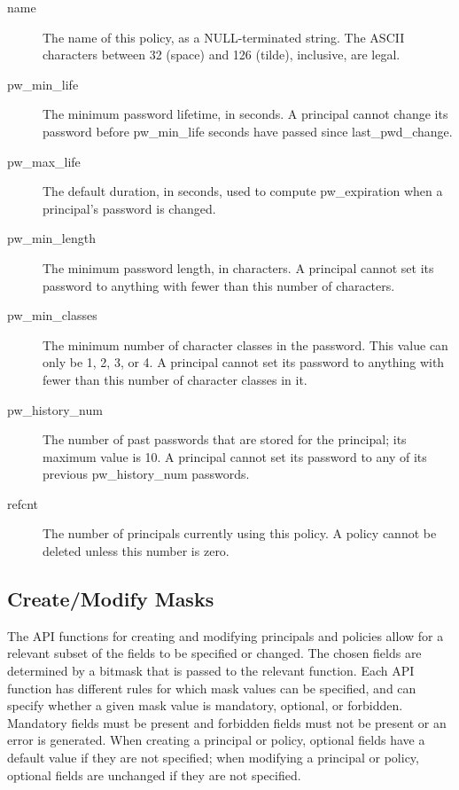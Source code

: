 \begin{description}
\item[name] The name of this policy, as a NULL-terminated string.
The ASCII characters between 32 (space) and 126 (tilde), inclusive,
are legal.

\item[pw_min_life] The minimum password lifetime, in seconds.
A principal cannot change its password before pw_min_life seconds have
passed since last_pwd_change.

\item[pw_max_life] The default duration, in seconds, used to compute
pw_expiration when a principal's password is changed.

\item[pw_min_length] The minimum password length, in characters.  A
principal cannot set its password to anything with fewer than this
number of characters.

\item[pw_min_classes] The minimum number of character classes in the
password.  This value can only be 1, 2, 3, or 4.  A principal cannot
set its password to anything with fewer than this number of character
classes in it.

\item[pw_history_num] The number of past passwords that are
stored for the principal; its maximum value is 10.  A principal cannot
set its password to any of its previous pw_history_num passwords.

\item[refcnt]  The number of principals currently using this policy.
A policy cannot be deleted unless this number is zero.
\end{description}

\subsection{Create/Modify Masks}
\label{sec:masks}

The API functions for creating and modifying principals and policies
allow for a relevant subset of the fields to be specified or changed.
The chosen fields are determined by a bitmask that is passed to the
relevant function.  Each API function has different rules for which
mask values can be specified, and can specify whether a given mask
value is mandatory, optional, or forbidden.  Mandatory fields must be
present and forbidden fields must not be present or an error is
generated.  When creating a principal or policy, optional fields have
a default value if they are not specified; when modifying a principal
or policy, optional fields are unchanged if they are not specified.

